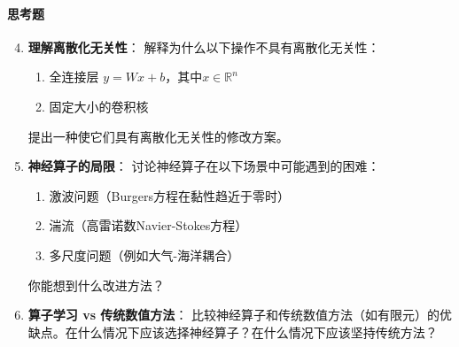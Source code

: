 \paragraph{思考题}
\begin{enumerate}
    \setcounter{enumi}{3}
    \item \textbf{理解离散化无关性}：
    解释为什么以下操作不具有离散化无关性：
    \begin{enumerate}
        \item 全连接层 $y = Wx + b$，其中$x \in \mathbb{R}^n$
        \item 固定大小的卷积核
    \end{enumerate}
    
    提出一种使它们具有离散化无关性的修改方案。
    
    \item \textbf{神经算子的局限}：
    讨论神经算子在以下场景中可能遇到的困难：
    \begin{enumerate}
        \item 激波问题（Burgers方程在黏性趋近于零时）
        \item 湍流（高雷诺数Navier-Stokes方程）
        \item 多尺度问题（例如大气-海洋耦合）
    \end{enumerate}
    
    你能想到什么改进方法？
    
    \item \textbf{算子学习 vs 传统数值方法}：
    比较神经算子和传统数值方法（如有限元）的优缺点。在什么情况下应该选择神经算子？在什么情况下应该坚持传统方法？
    
\end{enumerate}
